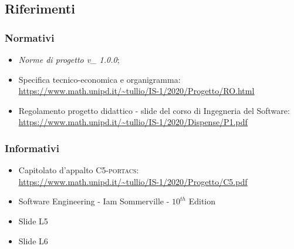 \subsection{Riferimenti}



\subsubsection{Normativi}

\begin{itemize}
	\item \textit{Norme di progetto v\_ 1.0.0};
	\item Specifica tecnico-economica e organigramma: \\ \uline{\url{https://www.math.unipd.it/~tullio/IS-1/2020/Progetto/RO.html}}
	\item Regolamento progetto didattico - slide del corso di Ingegneria del Software: \\ \uline{\url{https://www.math.unipd.it/~tullio/IS-1/2020/Dispense/P1.pdf}}
\end{itemize}



\subsubsection{Informativi}
\begin{itemize}
	\item Capitolato d'appalto C5-\textsc{portacs}: \\ \uline{\url{https://www.math.unipd.it/~tullio/IS-1/2020/Progetto/C5.pdf}}
	\item Software Engineering - Iam Sommerville - $10^{th}$ Edition
	\item Slide L5
	\item Slide L6
\end{itemize}